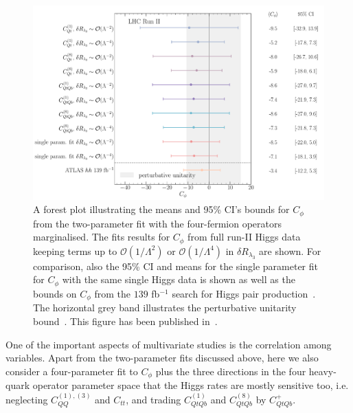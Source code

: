 \begin{figure}[htpb!]
	\begin{center}
		\includegraphics[width=\linewidth]{fig/uebeblick_forest_cphi_LHC_RunII}
	\end{center}
	\caption{A forest plot illustrating the means and 95\% CI's bounds for $C_\phi$ from the two-parameter fit with the four-fermion operators marginalised. The fits results for $C_\phi$ from full run-II Higgs data keeping terms up to $\mathcal{O}(1/\Lambda^2)$ or $\mathcal{O}(1/\Lambda^4)$ in $\delta R_{\lambda_3}$ are shown.  For comparison, also the 95\% CI and means for the single parameter fit for $C_\phi$ with the same single Higgs data is shown as well as the bounds on $C_{\phi}$ from the $139$ fb$^{-1}$ search for Higgs pair production~\cite{ATLAS:2021jki}. The horizontal grey band illustrates the perturbative unitarity bound~\cite{DiLuzio:2017tfn}. This figure has been published in~\cite{Alasfar:2022zyr}.\label{fig:summcphi}  }
\end{figure}
\par 
One of the important aspects of multivariate studies is the correlation among variables. Apart from the two-parameter fits discussed above, here we also consider a four-parameter fit to $C_\phi$ plus the three directions in the four heavy-quark operator parameter space that the Higgs rates are
mostly sensitive too, i.e. neglecting $C_{QQ}^{(1),(3) }$ and $C_{tt}$, and trading $C_{QtQb}^{(1)}$ and $C_{QtQb}^{(8)}$ by $C_{QtQb}^{+}$.
